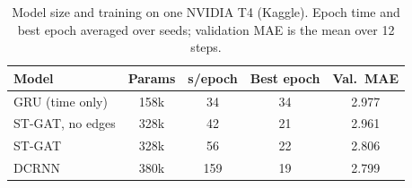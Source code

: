 \begin{table}[t]
\centering
\caption{Model size and training on one NVIDIA T4 (Kaggle). Epoch time and best epoch averaged over seeds; validation MAE is the mean over 12 steps.}
\label{tab:models}
\setlength{\tabcolsep}{4pt}
\begin{tabular}{@{}lcccc@{}}
\toprule
Model & Params & s/epoch & Best epoch & Val.\ MAE \\
\midrule
GRU (time only) & 158k & 34 & 34 & 2.977 \\
ST-GAT, no edges & 328k & 42 & 21 & 2.961 \\
ST-GAT & 328k & 56 & 22 & 2.806 \\
DCRNN & 380k & 159 & 19 & 2.799 \\
\bottomrule
\end{tabular}
\end{table}
